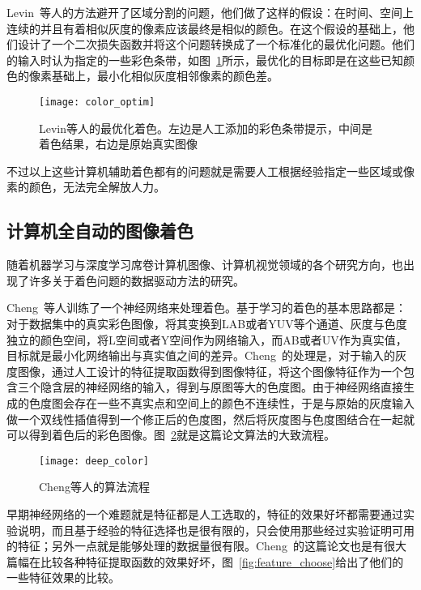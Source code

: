   Levin~\cite{journals/tog/LevinLW04}等人的方法避开了区域分割的问题，他们做了这样的假设：在时间、空间上连续的并且有着相似灰度的像素应该最终是相似的颜色。在这个假设的基础上，他们设计了一个二次损失函数并将这个问题转换成了一个标准化的最优化问题。他们的输入时认为指定的一些彩色条带，如图~\ref{fig:color_optim}所示，最优化的目标即是在这些已知颜色的像素基础上，最小化相似灰度相邻像素的颜色差。

  \begin{figure}[H]
    \centering
    \texttt{[image: color\_optim]}
    \caption{Levin等人的最优化着色。左边是人工添加的彩色条带提示，中间是着色结果，右边是原始真实图像}
    \label{fig:color_optim}
  \end{figure}

  不过以上这些计算机辅助着色都有的问题就是需要人工根据经验指定一些区域或像素的颜色，无法完全解放人力。

\subsection{计算机全自动的图像着色}
\label{sec:automatic-color}

  随着机器学习与深度学习席卷计算机图像、计算机视觉领域的各个研究方向，也出现了许多关于着色问题的数据驱动方法的研究。

  Cheng~\cite{DBLP:journals/corr/ChengYS16}等人训练了一个神经网络来处理着色。基于学习的着色的基本思路都是：对于数据集中的真实彩色图像，将其变换到LAB或者YUV等个通道、灰度与色度独立的颜色空间，将L空间或者Y空间作为网络输入，而AB或者UV作为真实值，目标就是最小化网络输出与真实值之间的差异。Cheng~\cite{DBLP:journals/corr/ChengYS16}的处理是，对于输入的灰度图像，通过人工设计的特征提取函数得到图像特征，将这个图像特征作为一个包含三个隐含层的神经网络的输入，得到与原图等大的色度图。由于神经网络直接生成的色度图会存在一些不真实点和空间上的颜色不连续性，于是与原始的灰度输入做一个双线性插值得到一个修正后的色度图，然后将灰度图与色度图结合在一起就可以得到着色后的彩色图像。图~\ref{fig:deep_color}就是这篇论文算法的大致流程。

  \begin{figure}[H]
    \centering
    \texttt{[image: deep\_color]}
    \caption{Cheng等人的算法流程}
    \label{fig:deep_color}
  \end{figure}

  早期神经网络的一个难题就是特征都是人工选取的，特征的效果好坏都需要通过实验说明，而且基于经验的特征选择也是很有限的，只会使用那些经过实验证明可用的特征；另外一点就是能够处理的数据量很有限。Cheng~\cite{DBLP:journals/corr/ChengYS16}的这篇论文也是有很大篇幅在比较各种特征提取函数的效果好坏，图~\ref{fig:feature_choose}给出了他们的一些特征效果的比较。

